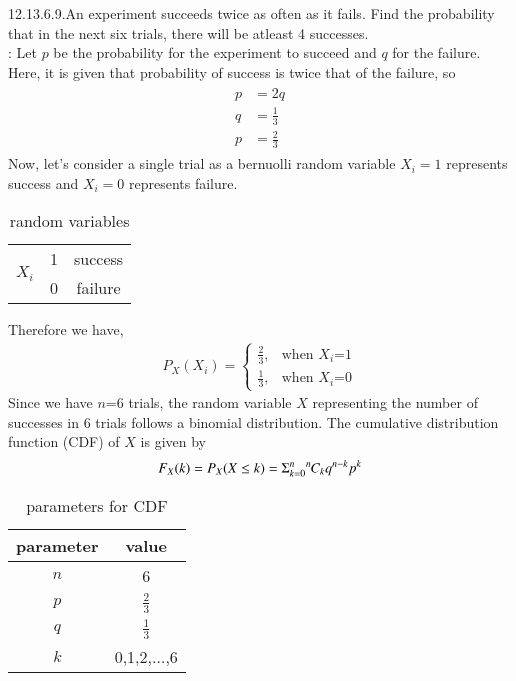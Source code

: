 \documentclass[journal,12pt,twocolumn]{IEEEtran}
\begin{document}
\renewcommand{\thefigure}{\theenumi}
\renewcommand{\thetable}{\theenumi}
12.13.6.9.An experiment succeeds twice as often as it fails. Find the probability that in the next six trials, there will be atleast 4 successes.
\\ \solution:
Let $p$ be the probability for the experiment to succeed and $q$ for the failure.\\
Here, it is given that probability of success is twice that of the failure, so 
\begin{align}
\begin{split}
p&=2q\\
q&= \frac{1}{3}\\
p&= \frac{2}{3}
\end{split}
\end{align}
Now, let's consider a single trial as a bernuolli random variable $X_{i}=1$ represents success and $X_{i}=0$ represents failure.
\begin{table}[h]
\centering
\caption{random variables}
\label{table.1:12.13.6.9}
\begin{tabular}{|c|c|c|}
\hline
\multirow{2}{*}{$X_i$}& 1 & success\\
\cline{2-2} \cline{3-3}
& 0 & failure\\
\hline
\end{tabular}
\end{table}
Therefore we have,
\begin{align}
           P_X(X_i)=
           \begin{cases}
           \frac{2}{3}, & \text{when $X_i$=1}\\
           \frac{1}{3}, & \text{when $X_i$=0}
           \end{cases}
\end{align}
Since we have $n$=6 trials, the random variable $X$ representing the number of successes in 6 trials follows a binomial distribution. The cumulative distribution function (CDF) of $X$ is given by
\begin{equation}
\label{eq:bd}
F_X(k)= P_X(X \le k)= \Sigma_{k=0}^n\comb{n}{k}q^{n-k}p^{k}
\end{equation}
\begin{table}[h]
\centering
\caption{parameters for CDF}
\label{table.2:12.13.6.9}
\begin{tabular}{|c|c|}
\hline
parameter & value\\
\hline
$n$ & 6\\
\hline
$p$ & $\frac{2}{3}$\\
\hline
$q$ & $\frac{1}{3}$\\
\hline
$k$ & 0,1,2,$\ldots$,6\\
\hline
\end{tabular}
\end{table}
\end{document}

